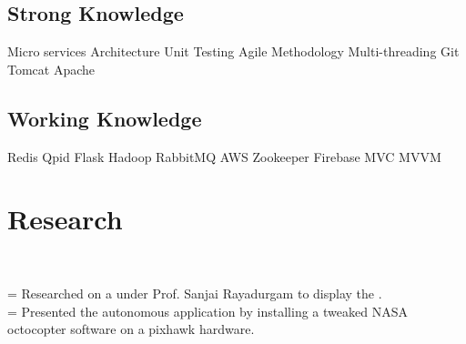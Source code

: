 \documentclass[]{rinkal_resume}
\begin{document}
\begin{minipage}[t]{0.30\textwidth}
\vspace{1pt}
\subsection{Strong Knowledge}
\vspace{1pt}
 \textbullet{} 
 \textbullet{} 
Micro services Architecture \textbullet{}
Unit Testing \textbullet{}
Agile Methodology \textbullet{} 
Multi-threading \textbullet{} 
Git \textbullet{} 
Tomcat \textbullet{}
Apache \textbullet{}
\sectionsep

\vspace{1pt}
\subsection{Working Knowledge}
\vspace{1pt}
  \textbullet{}
Redis \textbullet{}
Qpid \textbullet{}
Flask \textbullet{}
Hadoop \textbullet{}
RabbitMQ \textbullet{} 
AWS \textbullet{}
Zookeeper \textbullet{}
Firebase \textbullet{} 
MVC \textbullet{} 
MVVM \textbullet{}
\sectionsep


\section{Research}
 \\

\newlength\boxwid
\settowidth{\boxwid}{\indent\hspace{0.5cm}}

\hspace{0.2cm} \hangindent=\boxwid 
\textbullet{} Researched on a  under Prof. Sanjai Rayadurgam to display the . \\
\hspace{0.2cm} \hangindent=\boxwid 
\textbullet{} Presented the autonomous application by installing a tweaked NASA octocopter software on a pixhawk hardware. \\
\smallsectionsep


\end{minipage}
\end{document}
